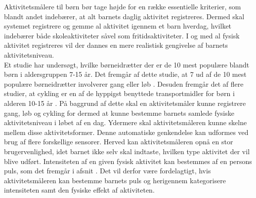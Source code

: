 Aktivitetsmålere til børn bør tage højde for en række essentielle kriterier, som blandt andet indebærer, at alt barnets daglig aktivitet registreres. Dermed skal systemet registrere og gemme al aktivitet igennem et barn hverdag, hvilket indebærer både skoleaktiviteter såvel som fritidsaktiviteter. I og med al fysisk aktivitet registreres vil der dannes en mere realistisk gengivelse af barnets aktivitetsniveau. \\%
Et studie har undersøgt, hvilke børneidrætter der er de 10 mest populære blandt børn i aldersgruppen 7-15 år. Det fremgår af dette studie, at 7 ud af de 10 mest populære børneidrætter involverer gang eller løb \citep{Asserhoej2013}. Desuden fremgår det af flere  studier, at cykling er en af de hyppigst benyttede transportmidler for børn i alderen 10-15 år \citep{DTU2014,COWI2015}. På baggrund af dette skal en aktivitetsmåler kunne registrere gang, løb og cykling for dermed at kunne bestemme barnets samlede fysiske aktivitetsniveau i løbet af en dag. Ydermere skal aktivitetsmåleren kunne skelne mellem disse aktivitetsformer. Denne automatiske genkendelse kan udformes ved brug af flere forskellige sensorer. Herved kan aktivitetsmåleren opnå en stor brugervenlighed, idet barnet ikke selv skal indtaste, hvilken type aktivitet der vil blive udført. \newline
Intensiteten af en given fysisk aktivitet kan bestemmes af en persons puls, som det fremgår i afsnit . Det vil derfor være fordelagtigt, hvis aktivitetsmåleren kan bestemme barnets puls og herigennem kategorisere intensiteten samt den fysiske effekt af aktiviteten.
%
%

